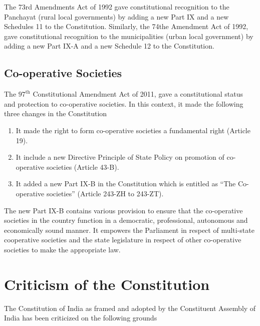 The 73rd Amendments Act of 1992 gave constitutional recognition to the Panchayat (rural local governments) by adding a new Part IX and a new Schedules 11 to the Constitution. Similarly, the 74the Amendment Act of 1992, gave constitutional recognition to the municipalities (urban local government) by adding a new Part IX-A and a new Schedule 12 to the Constitution.

\subsection{Co-operative Societies}

The $97^{\text{th}}$ Constitutional Amendment Act of 2011, gave a constitutional status and protection to co-operative societies. In this context, it made the following three changes in the Constitution

\begin{enumerate}
  \item It made the right to form co-operative societies a fundamental right (Article 19).
  \item It include a new Directive Principle of State Policy on promotion of co-operative societies (Article 43-B).
  \item It added a new Part IX-B in the Constitution which is entitled as ``The Co-operative societies'' (Article 243-ZH to 243-ZT).
\end{enumerate}

The new Part IX-B contains various provision to ensure that the co-operative societies in the country function in a democratic, professional, autonomous and economically sound manner. It empowers the Parliament in respect of multi-state cooperative societies and the state legislature in respect of other co-operative societies to make the appropriate law.

\section{Criticism of the Constitution}

The Constitution of India as framed and adopted by the Constituent Assembly of India has been criticized on the following grounds

